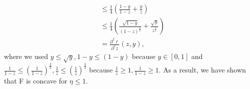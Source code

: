 \begin{solution}[]
\begin{align*}
							       &\leq \frac{1}{4} \left( \frac{1-y}{1-z} + \frac{y}{z} \right) \\
							       &\leq \frac{1}{4} \left( \frac{\sqrt{1-y}}{(1-z)^{\frac{3}{2}}} + \frac{\sqrt{y}}{z^{\frac{3}{2}}} \right) \\
							       &= \frac{\partial ^2 \ell}{\partial ^2 z} (z,y),
\end{align*}
where we used $ y \leq \sqrt{y}, 1-y \leq (1-y) $ because $ y \in[0,1] $ and $ \frac{1}{1-z} \leq \left(\frac{1}{1-z}\right)^{\frac{3}{2}}, \frac{1}{z} \leq \left( \frac{1}{z} \right)^{\frac{3}{2}} $ because $ \frac{1}{z} \geq 1, \frac{1}{1-z} \geq 1 $. As a result, we have shown that F is concave for $ \eta \leq 1 $.
\end{solution}
